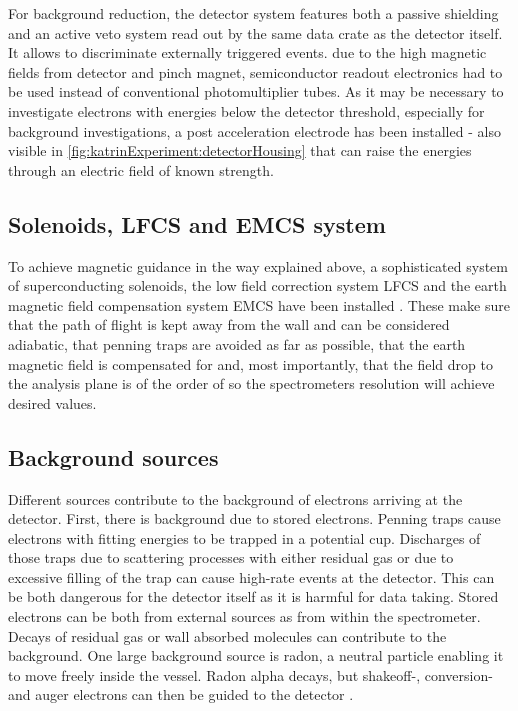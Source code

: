       
      For background reduction, the detector system features both a passive shielding and an active veto system read out by the same data crate as the detector itself. It allows to discriminate externally triggered events. due to the high magnetic fields from detector and pinch magnet, semiconductor readout electronics had to be used instead of conventional photomultiplier tubes.
      As it may be necessary to investigate electrons with energies below the detector threshold, especially for background investigations, a post acceleration electrode has been installed - also visible in \ref{fig:katrinExperiment:detectorHousing} that can raise the energies through an electric field of known strength.
      \subsection{Solenoids, LFCS and EMCS system}
      \label{ch:The KATRIN experiment:sec:Experimental setup:subsec:Solenoids, LFCS and EMCS system}
      
      To achieve magnetic guidance in the way explained above, a sophisticated system of superconducting solenoids, the low field correction system LFCS and the earth magnetic field compensation system EMCS have been installed \cite{airCoilSystem}. These make sure that the path of flight is kept away from the wall and can be considered adiabatic, that penning traps are avoided as far as possible, that the earth magnetic field is compensated for and, most importantly, that the field drop to the analysis plane is of the order of  so the spectrometers resolution will achieve desired values.
      

      \subsection{Background sources}
      \label{ch:The KATRIN experiment:sec:Experimental setup:subsec:BackgroundSources}
      Different sources contribute to the background of electrons arriving at the detector. First, there is background due to stored electrons. Penning traps cause electrons with fitting energies to be trapped in a potential cup. Discharges of those traps due to scattering processes with either residual gas or due to excessive filling of the trap can cause high-rate events at the detector. This can be both dangerous for the detector itself as it is harmful for data taking. Stored electrons can be both from external sources as from within the spectrometer. Decays of residual gas or wall absorbed molecules can contribute to the background. One large background source is radon, a neutral particle enabling it to move freely inside the vessel. Radon alpha decays, but shakeoff-, conversion- and auger electrons can then be guided to the detector \cite{radonGoerhard}.
      
